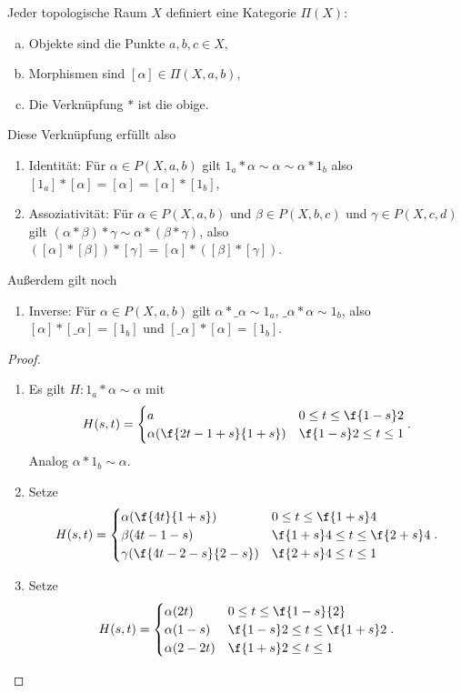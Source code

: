 \begin{st}
	Jeder topologische Raum $X$ definiert eine Kategorie $\Pi(X)$:
	\begin{enumerate}[(a)]
		\item
			Objekte sind die Punkte $a,b,c \in X$,
		\item
			Morphismen sind $[\alpha] \in \Pi(X,a,b)$,
		\item
			Die Verknüpfung $*$ ist die obige.
	\end{enumerate}
	Diese Verknüpfung erfüllt also
	\begin{enumerate}[(1)]
		\item
			Identität: Für $\alpha \in P(X,a,b)$ gilt $1_a * \alpha \sim \alpha \sim \alpha * 1_b$
			also $[1_a]*[\alpha] = [\alpha] = [\alpha] * [1_b]$,
		\item
			Assoziativität: Für $\alpha \in P(X,a,b)$ und $\beta \in P(X,b,c)$ und $\gamma \in P(X,c,d)$ gilt $(\alpha*\beta)*\gamma \sim \alpha*(\beta*\gamma)$, also $([\alpha]*[\beta])*[\gamma] = [\alpha] *([\beta]*[\gamma])$.
	\end{enumerate}
	Außerdem gilt noch
	\begin{enumerate}[(1),resume]
		\item
			Inverse: Für $\alpha \in P(X,a,b)$ gilt $\alpha * \_\alpha \sim 1_a$, $\_\alpha * \alpha \sim 1_b$, also $[\alpha]*[\_\alpha] = [1_b]$ und $[\_\alpha] * [\alpha] = [1_b]$.
	\end{enumerate}
	\begin{proof}
		\begin{enumerate}[(1)]
			\item
				Es gilt $H: 1_a * \alpha \sim \alpha$ mit
				\[
					H(s,t) = \begin{cases}
						a & 0 \le t \le \f{1-s}2 \\
						\alpha (\f{2t-1+s}{1+s}) & \f {1-s}2 \le t \le 1
					\end{cases}.
				\]
				Analog $\alpha * 1_b \sim \alpha$.
			\item
				Setze
				\[
					H(s,t) = \begin{cases}
						\alpha(\f{4t}{1+s}) & 0 \le t \le \f{1+s}4 \\
						\beta(4t - 1-s) & \f{1+s}4 \le t \le \f{2+s}4 \\
						\gamma(\f{4t-2-s}{2-s}) & \f{2+s}4 \le t \le 1
					\end{cases}.
				\]
			\item
				Setze
				\[
					H(s,t) = \begin{cases}
						\alpha(2t) & 0 \le t \le \f{1-s}{2} \\
						\alpha(1-s) & \f{1-s}2 \le t \le \f{1+s}2 \\
						\alpha(2-2t)  & \f{1+s}2 \le t \le 1
					\end{cases}.
				\]
		\end{enumerate}
	\end{proof}
\end{st}

